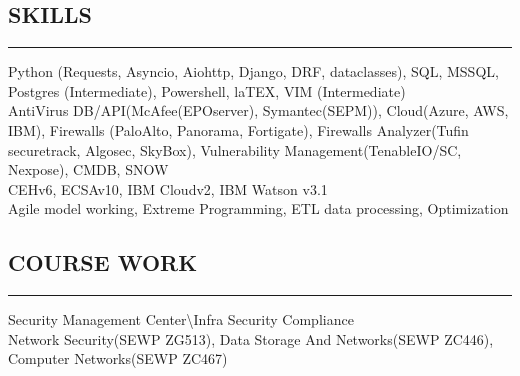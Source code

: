 \documentclass[10pt,a4]{article}
\begin{document}
\begin{small}
\subsection*{\color{dark_blue}SKILLS}
\vspace{-0.15cm}
\hrule
\vspace{0.1cm}
 Python {\color{gray}(Requests, Asyncio, Aiohttp, Django, DRF, dataclasses)}, SQL, MSSQL, Postgres {\color{gray}(Intermediate)}, Powershell, laTEX, VIM {\color{gray}(Intermediate)} \vspace{-0.25cm}\\

 AntiVirus DB/API{\color{gray}(McAfee(EPOserver), Symantec(SEPM))}, Cloud{\color{gray}(Azure, AWS, IBM)}, Firewalls {\color{gray}(PaloAlto, Panorama, Fortigate)}, Firewalls Analyzer{\color{gray}(Tufin securetrack, Algosec, SkyBox)},  Vulnerability Management{\color{gray}(TenableIO/SC, Nexpose)}, CMDB, SNOW  \vspace{-0.25cm}\\

 CEHv6, ECSAv10, IBM Cloudv2, IBM Watson v3.1  \vspace{-0.25cm}\\

{\noindent Agile model working, Extreme Programming, ETL data processing, Optimization}

\subsection*{\color{dark_blue}COURSE WORK}
\vspace{-0.15cm}
\hrule
\vspace{0.1cm}
 Security Management Center\textbackslash Infra Security Compliance \vspace{-0.25cm}\\

  Network Security{\color{gray}(SEWP ZG513)}, Data Storage And Networks{\color{gray}(SEWP ZC446)}, Computer Networks{\color{gray}(SEWP ZC467)} \vspace{-0.25cm}\\


\end{small}
\end{document}

